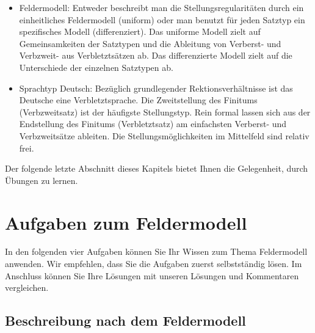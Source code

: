 \begin{itemize}
\begin{itemize}
\item Nachfeld: In allen Satztypen steht das Nachfeld nach der rechten Satzklammer. Typischerweise wird es von Nebensätzen besetzt und dient der Entlastung des Mittelfelds. Die Nachfeldbesetzung durch Infinitive bzw. Infinitivgruppen ist nur dann möglich, wenn der Infinitiv bzw. die Infinitivgruppe satzwertig ist (kohärente vs. inkohärente Konstruktion).

\item Anschlussfeld: In allen Satztypen gibt es ganz links ein Anschlussfeld. Im Anschlussfeld können Konjunktionen stehen, die gleichrangige Sätze miteinander verbinden.

\end{itemize}

\item Feldermodell: Entweder beschreibt man die Stellungsregularitäten durch ein einheitliches Feldermodell (uniform) oder man benutzt für jeden Satztyp ein spezifisches Modell (differenziert). Das uniforme Modell zielt auf Gemeinsamkeiten der Satztypen und die Ableitung von Verberst- und Verbzweit- aus Verbletztsätzen ab. Das differenzierte Modell zielt auf die Unterschiede der einzelnen Satztypen ab.

\item Sprachtyp Deutsch: Bezüglich grundlegender Rektionsverhältnisse ist das Deutsche eine Verbletztsprache. Die Zweitstellung des Finitums (Verbzweitsatz) ist der häufigste Stellungstyp. Rein formal lassen sich aus der Endstellung des Finitums (Verbletztsatz) am einfachsten Verberst- und Verbzweitsätze ableiten. Die Stellungsmöglichkeiten im Mittelfeld sind relativ frei.

\end{itemize}

Der folgende letzte Abschnitt dieses Kapitels bietet Ihnen die Gelegenheit, durch Übungen zu lernen.


\section{Aufgaben zum Feldermodell}\label{section:Aufgaben_Feldermodell}

In den folgenden vier Aufgaben können Sie Ihr Wissen zum Thema Feldermodell anwenden. Wir empfehlen, dass Sie die Aufgaben zuerst selbstständig lösen. Im Anschluss können Sie Ihre Lösungen mit unseren Lösungen und Kommentaren vergleichen.

\subsection{Beschreibung nach dem Feldermodell}\label{subsection:FM1}

